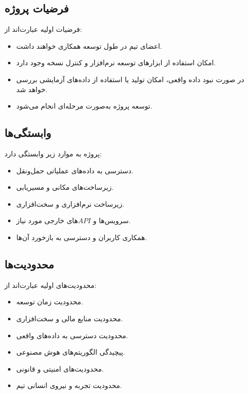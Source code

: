 \documentclass[12pt,a4paper]{article}
\begin{document}
	\subsection{فرضیات پروژه}
	
	فرضیات اولیه عبارت‌اند از:
	
	\begin{itemize}
		\item اعضای تیم در طول توسعه همکاری خواهند داشت.
		\item امکان استفاده از ابزارهای توسعه نرم‌افزار
		و کنترل نسخه وجود دارد.
		\item در صورت نبود داده واقعی، امکان تولید
		یا استفاده از داده‌های آزمایشی بررسی خواهد شد.
		\item توسعه پروژه به‌صورت مرحله‌ای انجام می‌شود.
	\end{itemize}
	
	\subsection{وابستگی‌ها}
	
	پروژه به موارد زیر وابستگی دارد:
	
	\begin{itemize}
		\item دسترسی به داده‌های عملیاتی حمل‌ونقل.
		\item زیرساخت‌های مکانی و مسیریابی.
		\item زیرساخت نرم‌افزاری و سخت‌افزاری.
		\item سرویس‌ها و $API$های خارجی مورد نیاز.
		\item همکاری کاربران و دسترسی به بازخورد آن‌ها.
	\end{itemize}
	
	\subsection{محدودیت‌ها}
	
	محدودیت‌های اولیه عبارت‌اند از:
	
	\begin{itemize}
		\item محدودیت زمان توسعه.
		\item محدودیت منابع مالی و سخت‌افزاری.
		\item محدودیت دسترسی به داده‌های واقعی.
		\item پیچیدگی الگوریتم‌های هوش مصنوعی.
		\item محدودیت‌های امنیتی و قانونی.
		\item محدودیت تجربه و نیروی انسانی تیم.
	\end{itemize}
	
\end{document}
